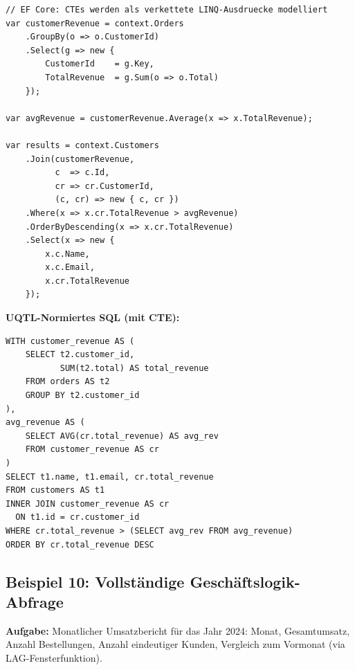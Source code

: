 \begin{lstlisting}[style=csharpstyle, caption={Beispiel 9 -- C\# (CTE-Aequivalent)},
  label=lst:bsp9_cs]
// EF Core: CTEs werden als verkettete LINQ-Ausdruecke modelliert
var customerRevenue = context.Orders
    .GroupBy(o => o.CustomerId)
    .Select(g => new {
        CustomerId    = g.Key,
        TotalRevenue  = g.Sum(o => o.Total)
    });

var avgRevenue = customerRevenue.Average(x => x.TotalRevenue);

var results = context.Customers
    .Join(customerRevenue,
          c  => c.Id,
          cr => cr.CustomerId,
          (c, cr) => new { c, cr })
    .Where(x => x.cr.TotalRevenue > avgRevenue)
    .OrderByDescending(x => x.cr.TotalRevenue)
    .Select(x => new {
        x.c.Name,
        x.c.Email,
        x.cr.TotalRevenue
    });
\end{lstlisting}

\begin{successbox}
\textbf{UQTL-Normiertes SQL (mit CTE):}
\begin{lstlisting}[style=sqlstyle, numbers=none]
WITH customer_revenue AS (
    SELECT t2.customer_id,
           SUM(t2.total) AS total_revenue
    FROM orders AS t2
    GROUP BY t2.customer_id
),
avg_revenue AS (
    SELECT AVG(cr.total_revenue) AS avg_rev
    FROM customer_revenue AS cr
)
SELECT t1.name, t1.email, cr.total_revenue
FROM customers AS t1
INNER JOIN customer_revenue AS cr
  ON t1.id = cr.customer_id
WHERE cr.total_revenue > (SELECT avg_rev FROM avg_revenue)
ORDER BY cr.total_revenue DESC
\end{lstlisting}
\end{successbox}

\subsection{Beispiel 10: Vollständige Geschäftslogik-Abfrage}
\label{subsec:bsp10}

\textbf{Aufgabe:} Monatlicher Umsatzbericht für das Jahr 2024: Monat, Gesamtumsatz,
Anzahl Bestellungen, Anzahl eindeutiger Kunden, Vergleich zum Vormonat
(via LAG-Fensterfunktion).

